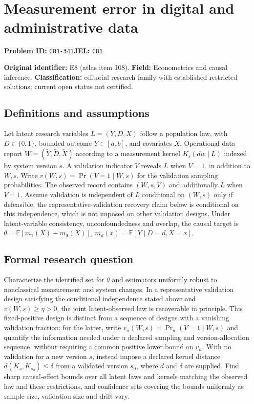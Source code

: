 \documentclass[11pt,a4paper]{article}
\begin{document}
\section*{Measurement error in digital and administrative data}
\textbf{Problem ID:} \texttt{C81-341}\quad \textbf{JEL:} \texttt{C81}\par
\label{problem:OP-0108}
\label{atlas:prob:E8}

\noindent\textbf{Original identifier:} E8 (atlas item 108). \textbf{Field:} Econometrics and causal inference. \textbf{Classification:} editorial research family with established restricted solutions; current open status not certified.

\subsection*{Definitions and assumptions}

Let latent research variables $L=(Y,D,X)$ follow a population law, with $D\in\{0,1\}$, bounded outcome $Y\in[a,b]$, and covariates $X$. Operational data report $W=(\widetilde Y,\widetilde D,\widetilde X)$ according to a measurement kernel $K_s(dw\mid L)$ indexed by system version $s$. A validation indicator $V$ reveals $L$ when $V=1$, in addition to $W,s$. Write $v(W,s)=\Pr(V=1\mid W,s)$ for the validation sampling probabilities. The observed record contains $(W,s,V)$ and additionally $L$ when $V=1$. Assume validation is independent of $L$ conditional on $(W,s)$ only if defensible; the representative-validation recovery claim below is conditional on this independence, which is not imposed on other validation designs. Under latent-variable consistency, unconfoundedness and overlap, the causal target is $\theta=\mathbb E[m_1(X)-m_0(X)]$, $m_d(x)=\mathbb E[Y\mid D=d,X=x]$.

\subsection*{Formal research question}

Characterize the identified set for $\theta$ and estimators uniformly robust to nonclassical measurement and system changes. In a representative validation design satisfying the conditional independence stated above and $v(W,s)\ge\eta>0$, the joint latent-observed law is recoverable in principle. This fixed-positive design is distinct from a sequence of designs with a vanishing validation fraction: for the latter, write $v_n(W,s)=\Pr_n(V=1\mid W,s)$ and quantify the information needed under a declared sampling and version-allocation sequence, without requiring a common positive lower bound on $v_n$. With no validation for a new version $s$, instead impose a declared kernel distance $d(K_s,K_{s_0})\le\delta$ from a validated version $s_0$, where $d$ and $\delta$ are supplied. Find sharp causal-effect bounds over all latent laws and kernels matching the observed law and these restrictions, and confidence sets covering the bounds uniformly as sample size, validation size and drift vary.
\end{document}

